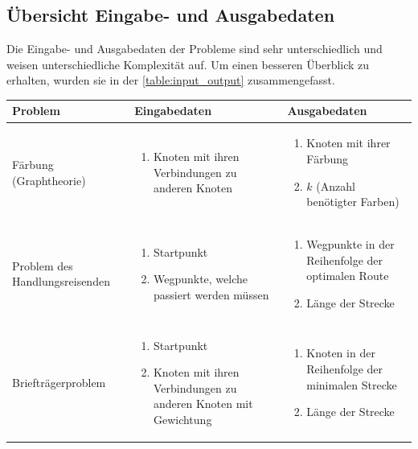 \newpage
\subsection{Übersicht Eingabe- und Ausgabedaten \resultAssignment{[R2]}}\label{overview_input_output}
Die Eingabe- und Ausgabedaten der Probleme sind sehr unterschiedlich und weisen unterschiedliche Komplexität auf. Um einen besseren Überblick zu erhalten, wurden sie in der 
\autoref{table:input_output} zusammengefasst.
\begin{table}[ht]
\centering
  \begin{tabular}{ p{3cm} | p{5.4cm} | p{5.4cm} }
	\hline
	\rowcolor{gray}
	\textbf{Problem}				& \textbf{Eingabedaten}								& \textbf{Ausgabedaten}\\ \hline
	Färbung (Graphtheorie)			& \begin{enumerate}
								\item Knoten mit ihren Verbindungen zu anderen Knoten
							   \end{enumerate}				
							&  \begin{enumerate}
								\item Knoten mit ihrer Färbung
								\item $k$ (Anzahl benötigter Farben)
							   \end{enumerate}	\\ \hline
	Problem des Handlungsreisenden		& \begin{enumerate}
								\item Startpunkt
								\item Wegpunkte, welche passiert werden müssen
							   \end{enumerate}				
							&  \begin{enumerate}
								\item Wegpunkte in der Reihenfolge der optimalen Route
								\item Länge der Strecke
							   \end{enumerate}	\\ \hline
	Briefträgerproblem	 			& \begin{enumerate}
								\item Startpunkt
								\item Knoten mit ihren Verbindungen zu anderen Knoten mit Gewichtung
							   \end{enumerate}				
							&  \begin{enumerate}
								\item Knoten in der Reihenfolge der minimalen Strecke
								\item Länge der Strecke

\end{enumerate}
\end{tabular}
\end{table}
